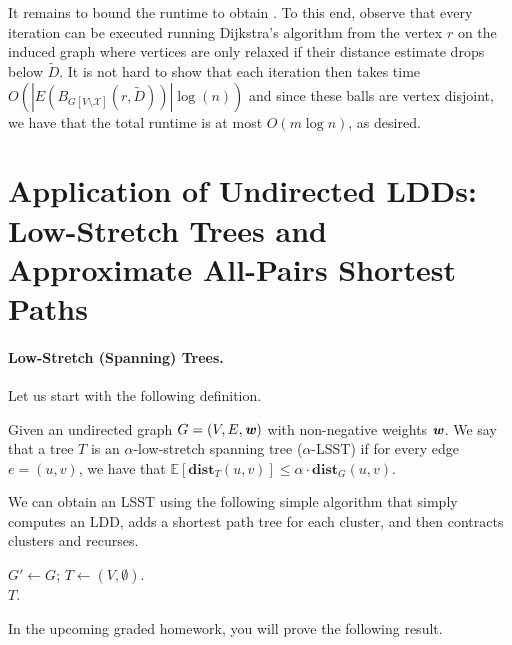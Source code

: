 It remains to bound the runtime to obtain . To this end, observe that every iteration can be executed running Dijkstra's algorithm from the vertex $r$ on the induced graph where vertices are only relaxed if their distance estimate drops below $\tilde{D}$. It is not hard to show that each iteration then takes time $O(|E(B_{G[V \setminus \mathcal{X}]}(r, \tilde{D}))| \log(n))$ and since these balls are vertex disjoint, we have that the total runtime is at most $O(m\log n)$, as desired.

\section{Application of Undirected LDDs: Low-Stretch Trees and Approximate All-Pairs Shortest Paths}

\paragraph{Low-Stretch (Spanning) Trees.} Let us start with the following definition.

\begin{definition}
Given an undirected graph $G=(V,E, \boldsymbol{\mathit{w}})$ with non-negative weights $\boldsymbol{\mathit{w}}$. We say that a tree $T$ is an $\alpha$-low-stretch spanning tree ($\alpha$-LSST) if for every edge $e = (u,v)$, we have that $\mathbb{E}[\mathbf{dist}_T(u,v)] \leq \alpha \cdot \mathbf{dist}_G(u,v)$. 
\end{definition}

We can obtain an LSST using the following simple algorithm that simply computes an LDD, adds a shortest path tree for each cluster, and then contracts clusters and recurses.

\begin{algorithm}
$G' \gets G$; $T \gets (V , \emptyset)$.\\
\Return $T$.
\caption{$\textsc{ComputeLSST}(G)$}
\label{alg:computeLSST}
\end{algorithm}

In the upcoming graded homework, you will prove the following result.

